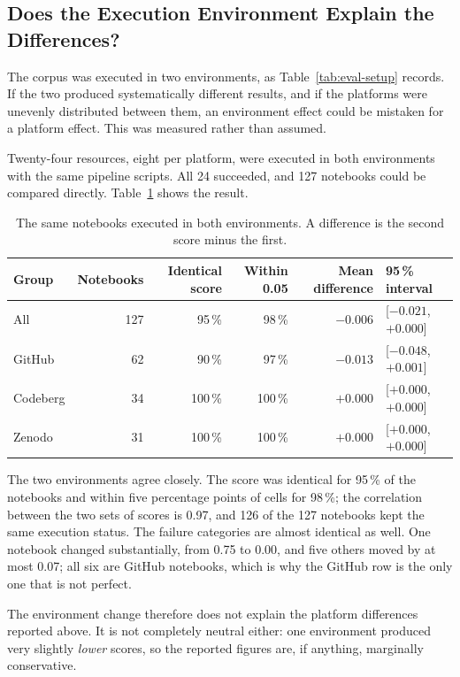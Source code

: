 \subsection{Does the Execution Environment Explain the Differences?}
\label{sec:eval-environment}

The corpus was executed in two environments, as Table~\ref{tab:eval-setup} records. If the two produced systematically different results, and if the platforms were unevenly distributed between them, an environment effect could be mistaken for a platform effect. This was measured rather than assumed.

Twenty-four resources, eight per platform, were executed in both environments with the same pipeline scripts. All 24 succeeded, and 127 notebooks could be compared directly. Table~\ref{tab:env-check} shows the result.

\begin{table}[htbp]
\centering
\caption{The same notebooks executed in both environments. A difference is the second score minus the first.}
\label{tab:env-check}
\small
\begin{tabularx}{\textwidth}{@{}l r r r r X@{}}
\toprule
Group & Notebooks & Identical score & Within 0.05 & Mean difference & 95\,\% interval\tabularnewline
\midrule
All & 127 & 95\,\% & 98\,\% & $-0.006$ & [$-0.021$, $+0.000$]\tabularnewline
GitHub & 62 & 90\,\% & 97\,\% & $-0.013$ & [$-0.048$, $+0.001$]\tabularnewline
Codeberg & 34 & 100\,\% & 100\,\% & $+0.000$ & [$+0.000$, $+0.000$]\tabularnewline
Zenodo & 31 & 100\,\% & 100\,\% & $+0.000$ & [$+0.000$, $+0.000$]\tabularnewline
\bottomrule
\end{tabularx}
\end{table}

The two environments agree closely. The score was identical for 95\,\% of the notebooks and within five percentage points of cells for 98\,\%; the correlation between the two sets of scores is 0.97, and 126 of the 127 notebooks kept the same execution status. The failure categories are almost identical as well. One notebook changed substantially, from 0.75 to 0.00, and five others moved by at most 0.07; all six are GitHub notebooks, which is why the GitHub row is the only one that is not perfect.

The environment change therefore does not explain the platform differences reported above. It is not completely neutral either: one environment produced very slightly \emph{lower} scores, so the reported figures are, if anything, marginally conservative.

